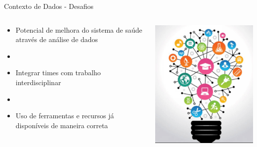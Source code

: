 \documentclass[10pt,brazil]{beamer}
\theoremstyle{definition}
\begin{document}
\begin{frame}{Contexto de Dados - Desafios}
  \begin{columns}%
      \begin{column}{0.5\textwidth}
  \begin{itemize}
    \item[] Potencial de melhora do sistema de saúde através de análise de dados
    \item[]
    \item[] Integrar times com trabalho interdisciplinar
    \item[]
    \item[] Uso de ferramentas e recursos já disponíveis de maneira correta
  \end{itemize}
    \end{column}
    \begin{column}{0.5\textwidth}
      \begin{center}
        \includegraphics[width=1\textwidth]{interdisciplinar.png}
      \end{center}

\end{column}
\end{columns}
\end{frame}
\end{document}
